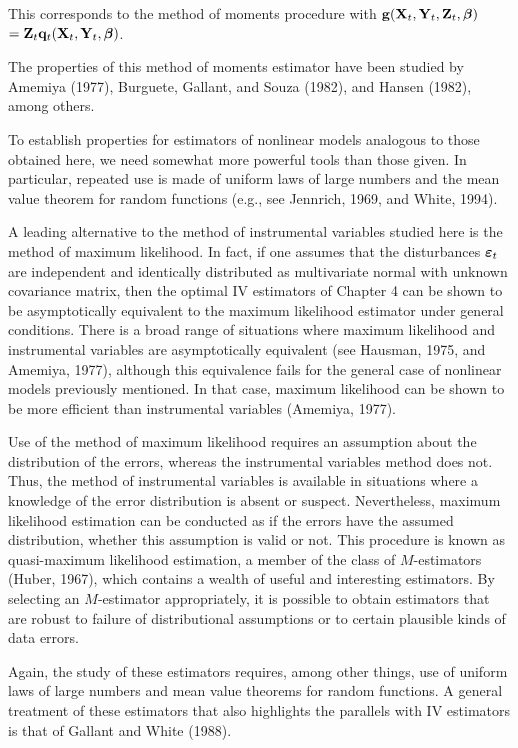 This corresponds to the method of moments procedure with $\mathbf{g}(\mathbf{X}_t, \mathbf{Y}_t, \mathbf{Z}_t, \boldsymbol{\beta})$
$= \mathbf{Z}_t \mathbf{q}_t(\mathbf{X}_t, \mathbf{Y}_t, \boldsymbol{\beta})$.

The properties of this method of moments estimator have been studied
by Amemiya (1977), Burguete, Gallant, and Souza (1982), and Hansen
(1982), among others.

To establish properties for estimators of nonlinear models analogous to
those obtained here, we need somewhat more powerful tools than those
given. In particular, repeated use is made of uniform laws of large numbers
and the mean value theorem for random functions (e.g., see Jennrich, 1969,
and White, 1994).

A leading alternative to the method of instrumental variables studied
here is the method of maximum likelihood. In fact, if one assumes that
the disturbances $\boldsymbol{\varepsilon}_t$ are independent and identically distributed as multivariate normal with unknown covariance matrix, then the optimal IV estimators of Chapter 4 can be shown to be asymptotically equivalent to the
maximum likelihood estimator under general conditions. There is a broad
range of situations where maximum likelihood and instrumental variables
are asymptotically equivalent (see Hausman, 1975, and Amemiya, 1977),
although this equivalence fails for the general case of nonlinear models previously mentioned. In that case, maximum likelihood can be shown to be
more efficient than instrumental variables (Amemiya, 1977).

Use of the method of maximum likelihood requires an assumption about
the distribution of the errors, whereas the instrumental variables method
does not. Thus, the method of instrumental variables is available in situations where a knowledge of the error distribution is absent or suspect.
Nevertheless, maximum likelihood estimation can be conducted as if the errors have the assumed distribution, whether this assumption is valid or not.
This procedure is known as quasi-maximum likelihood estimation, a member of the class of $M$-estimators (Huber, 1967), which contains a wealth
of useful and interesting estimators. By selecting an $M$-estimator appropriately, it is possible to obtain estimators that are robust to failure of
distributional assumptions or to certain plausible kinds of data errors.

Again, the study of these estimators requires, among other things, use
of uniform laws of large numbers and mean value theorems for random
functions. A general treatment of these estimators that also highlights the
parallels with IV estimators is that of Gallant and White (1988).

